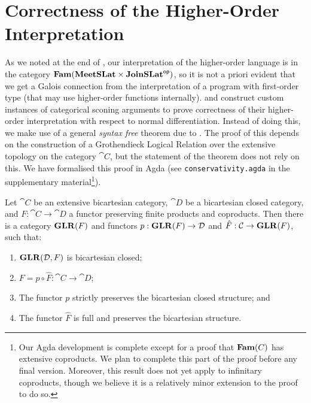 \section{Correctness of the Higher-Order Interpretation}
\label{sec:definability}

As we noted at the end of , our
interpretation of the higher-order language is in the category
$\mathbf{Fam}(\mathbf{MeetSLat} \times \mathbf{JoinSLat}^{\mathsf{op}})$, so it is not a priori evident
that we get a Galois connection from the interpretation of a program
with first-order type (that may use higher-order functions
internally). \citet{vakar22} and \citet{nunes2023} construct custom
instances of categorical sconing arguments to prove correctness of
their higher-order interpretation with respect to normal
differentiation. Instead of doing this, we make use of a general
\emph{syntax free} theorem due to \citet{fiore-simpson99}. The proof
of this depends on the construction of a Grothendieck Logical Relation
over the extensive topology on the category $\cat{C}$, but the
statement of the theorem does not rely on this. We have formalised
this proof in Agda (see \texttt{conservativity.agda} in the
supplementary material\footnote{Our Agda development is complete
  except for a proof that $\mathbf{Fam}(C)$ has extensive coproducts. We plan
  to complete this part of the proof before any final
  version. Moreover, this result does not yet apply to infinitary
  coproducts, though we believe it is a relatively minor extension to
  the proof to do so.}).

\begin{theorem}
  \label{thm:glr-definability}
  Let $\cat{C}$ be an extensive bicartesian category, $\cat{D}$ be a
  bicartesian closed category, and $F : \cat{C} \to \cat{D}$ a functor
  preserving finite products and coproducts. Then there is a category
  $\mathbf{GLR}(F)$ and functors $p : \mathbf{GLR}(F) \to \mathcal{D}$ and
  $\hat{F} : \mathcal{C} \to \mathbf{GLR}(F)$, such that:
  \begin{enumerate}
  \item $\mathbf{GLR}(\mathcal{D},F)$ is bicartesian closed;
  \item $F = p \circ \hat{F} : \cat{C} \to \cat{D}$;
  \item The functor $p$ strictly preserves the bicartesian closed structure; and
  \item The functor $\hat{F}$ is full and preserves the bicartesian structure.
  \end{enumerate}
\end{theorem}

